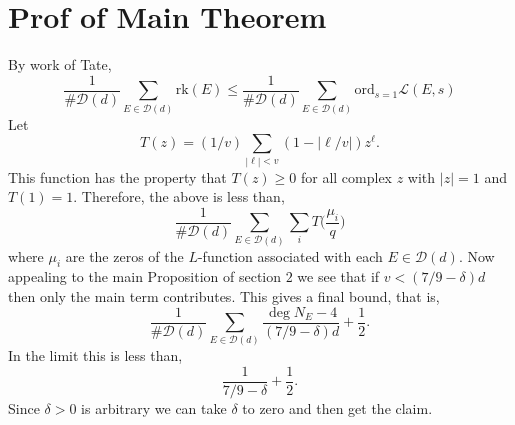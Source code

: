 \documentclass[12pt,reqno]{amsart}
\begin{document}
\section{Prof of Main Theorem}

By work of Tate, 
$$
\frac{1}{\#\mathcal{D}(d)} \sum_{E \in \mathcal{D}(d)} \text{rk}(E) \leq \frac{1}{\# \mathcal{D}(d)} \sum_{E \in \mathcal{D}(d)} \text{ord}_{s = 1} \mathcal{L}(E, s)
$$
Let $$
T(z) = (1 / v) \sum_{|\ell| < v} (1 - |\ell / v|) z^{\ell}.
$$ 
This function has the property that $T(z) \geq 0$ for all complex $z$ with $|z| = 1$ and $T(1) = 1$. Therefore, the above is less than,
$$
\frac{1}{\#\mathcal{D}(d)} \sum_{E \in \mathcal{D}(d)} \sum_{i} T \Big ( \frac{\mu_i}{q} \Big )
$$
where $\mu_i$ are the zeros of the $L$-function associated with each $E \in \mathcal{D}(d)$.
Now appealing to the main Proposition of section $2$ we see that if $v < (7/9 - \delta) d$ then only the main term contributes. This gives a final bound, that is,
$$
\frac{1}{\# \mathcal{D}(d)} \sum_{E \in \mathcal{D}(d)} \frac{\deg N_E - 4}{(7 / 9 - \delta) d} + \frac{1}{2}.
$$
In the limit this is less than, 
$$
\frac{1}{7 / 9 - \delta} + \frac{1}{2}.
$$
Since $\delta > 0$ is arbitrary we can take $\delta$ to zero and then get the claim. 

\newpage
\printbibliography
%
%
\end{document}
